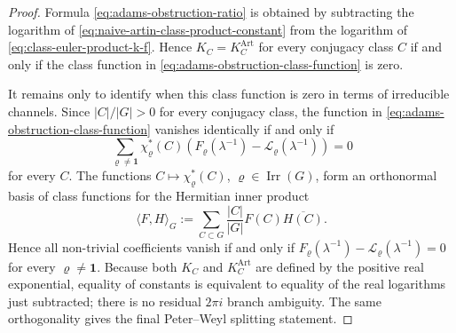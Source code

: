 \documentclass[11pt,a4paper]{amsart}
\theoremstyle{plain}
\theoremstyle{definition}
\theoremstyle{remark}
\DeclareMathOperator{\Irr}{Irr}
\begin{document}
\begin{proof}
  Formula \eqref{eq:adams-obstruction-ratio} is obtained by subtracting
  the logarithm of \eqref{eq:naive-artin-class-product-constant} from
  the logarithm of \eqref{eq:class-euler-product-k-f}. Hence
  \(K_C=K_C^{\mathrm{Art}}\) for every conjugacy class \(C\) if and only
  if the class function in
  \eqref{eq:adams-obstruction-class-function} is zero.

  It remains only to identify when this class function is zero in terms
  of irreducible channels. Since \(|C|/|G|>0\) for every conjugacy class,
  the function in \eqref{eq:adams-obstruction-class-function} vanishes
  identically if and only if
  \[
    \sum_{\varrho\neq\mathbf1}\chi_\varrho^\ast(C)
      \left(F_\varrho(\lambda^{-1})-
      \mathcal L_\varrho(\lambda^{-1})\right)
    =0
  \]
  for every \(C\). The functions
  \(C\mapsto \chi_\varrho^\ast(C)\), \(\varrho\in\Irr(G)\), form an
  orthonormal basis of class functions for the Hermitian inner product
  \[
    \langle F,H\rangle_G
    :=
    \sum_{C\subset G}\frac{|C|}{|G|}F(C)\overline{H(C)}.
  \]
  Hence all non-trivial coefficients vanish if and only if
  \(F_\varrho(\lambda^{-1})-
  \mathcal L_\varrho(\lambda^{-1})=0\) for every
  \(\varrho\neq\mathbf1\). Because both \(K_C\) and
  \(K_C^{\mathrm{Art}}\) are defined by the positive real exponential,
  equality of constants is equivalent to equality of the real logarithms just
  subtracted; there is no residual \(2\pi i\) branch ambiguity.  The same
  orthogonality gives the final Peter--Weyl splitting statement.
\end{proof}
\end{document}
